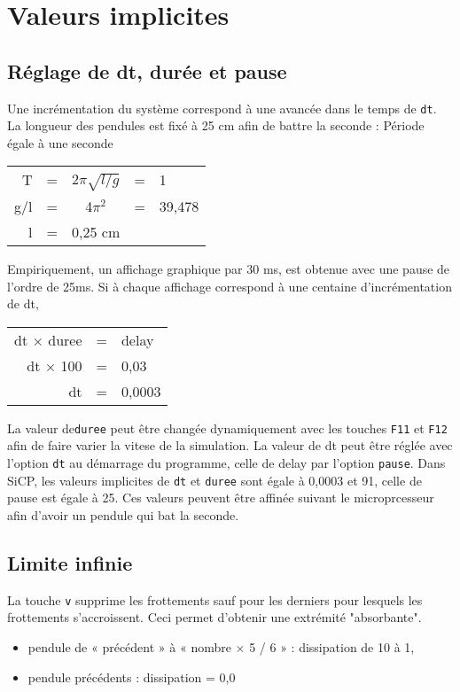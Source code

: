 %
\section{Valeurs implicites}
%
%
\subsection{Réglage de dt, durée et pause}
Une incrémentation du système correspond à une avancée dans le temps de \texttt{dt}. La longueur des pendules est fixé à 25 cm afin de battre la seconde :
Période égale à une seconde
\begin{center}
	\begin{tabular}{rcccl}
	T & = & 2$\pi \sqrt{l/g}$ & = & 1\\
	g/l & = & 4$\pi^2$ & = & 39,478\\
	l & = & 0,25 cm &\\
	\end{tabular}
\end{center}
Empiriquement, un affichage graphique par 30 ms, est obtenue avec une pause de l'ordre de 25ms. Si à chaque affichage correspond à une centaine d'incrémentation de dt, 
\begin{center}
	\begin{tabular}{rcl}
	dt $\times$ duree & = & delay\\
	dt $\times$ 100 & = & 0,03\\
	dt & = & 0,0003\\
	\end{tabular}
\end{center}
La valeur de\texttt {duree} peut être changée dynamiquement avec les touches \texttt{F11} et \texttt{F12} afin de faire varier la vitese de la simulation. La valeur de dt peut être réglée avec l'option \texttt{dt} au démarrage du programme, celle de delay par l'option \texttt{pause}.
Dans SiCP, les valeurs implicites de \texttt{dt} et \texttt{duree} sont égale à 0,0003 et 91, celle de pause est égale à 25. Ces valeurs peuvent être affinée suivant le microprcesseur afin d'avoir un pendule qui bat la seconde.
%
%
\subsection{Limite infinie}
La touche \texttt{v} supprime les frottements sauf pour les derniers pour lesquels les frottements s'accroissent. Ceci permet d'obtenir une extrémité "absorbante".
\begin{itemize}[label=, leftmargin=2cm]
\item pendule de  « précédent »  à  «  nombre $\times$ 5 / 6 » : dissipation de 10 à 1,
\item pendule précédents : dissipation = 0,0
\end{itemize}
%
%
